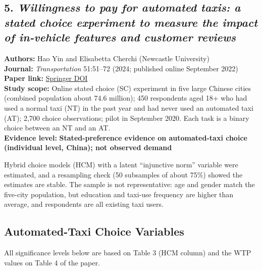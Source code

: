 \documentclass[10pt,a4paper]{article}
\begin{document}
\begin{mdframed}[linecolor=red!60,linewidth=2pt]
\color{blue!100}


\hypertarget{willingness-to-pay-for-automated-taxis}{%
\section{\texorpdfstring{5. \emph{Willingness to pay for automated taxis: a stated choice experiment to measure the impact of in-vehicle features and customer reviews}}{5. Willingness to pay for automated taxis: a stated choice experiment to measure the impact of in-vehicle features and customer reviews}}\label{willingness-to-pay-for-automated-taxis}}

\textbf{Authors:} Hao Yin and Elisabetta Cherchi (Newcastle University)\\
\textbf{Journal:} \emph{Transportation} 51:51--72 (2024; published online September 2022)\\
\textbf{Paper link:} \href{https://doi.org/10.1007/s11116-022-10319-3}{Springer DOI}\\
\textbf{Study scope:} Online stated choice (SC) experiment in five large Chinese cities (combined population about 74.6 million); 450 respondents aged 18+ who had used a normal taxi (NT) in the past year and had never used an automated taxi (AT); 2,700 choice observations; pilot in September 2020. Each task is a binary choice between an NT and an AT.\\
\textbf{Evidence level:} \textbf{Stated-preference evidence on automated-taxi choice (individual level, China); not observed demand}

Hybrid choice models (HCM) with a latent ``injunctive norm'' variable were estimated, and a resampling check (50 subsamples of about 75\%) showed the estimates are stable. The sample is not representative: age and gender match the five-city population, but education and taxi-use frequency are higher than average, and respondents are all existing taxi users.

\hypertarget{automated-taxi-choice-variables}{%
\subsection{Automated-Taxi Choice Variables}\label{automated-taxi-choice-variables}}

All significance levels below are based on Table 3 (HCM column) and the WTP values on Table 4 of the paper.


\end{mdframed}
\end{document}
